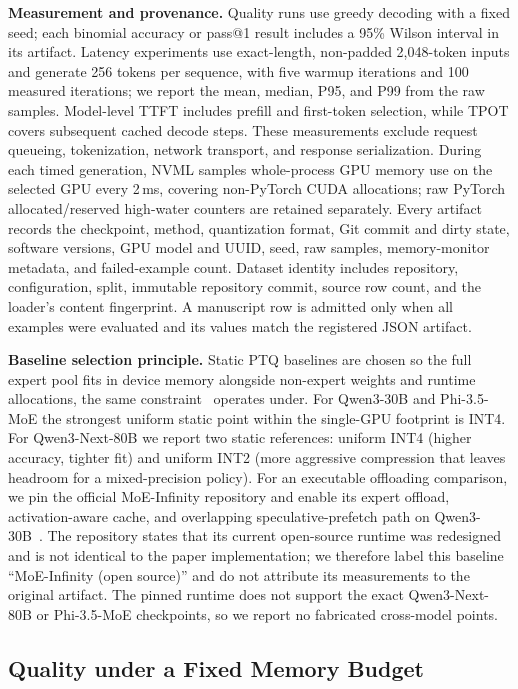 \noindent\textbf{Measurement and provenance.}
Quality runs use greedy decoding with a fixed seed; each binomial accuracy or pass@1 result includes a 95\% Wilson interval in its artifact. Latency experiments use exact-length, non-padded 2,048-token inputs and generate 256 tokens per sequence, with five warmup iterations and 100 measured iterations; we report the mean, median, P95, and P99 from the raw samples. Model-level TTFT includes prefill and first-token selection, while TPOT covers subsequent cached decode steps. These measurements exclude request queueing, tokenization, network transport, and response serialization. During each timed generation, NVML samples whole-process GPU memory use on the selected GPU every 2\,ms, covering non-PyTorch CUDA allocations; raw PyTorch allocated/reserved high-water counters are retained separately. Every artifact records the checkpoint, method, quantization format, Git commit and dirty state, software versions, GPU model and UUID, seed, raw samples, memory-monitor metadata, and failed-example count. Dataset identity includes repository, configuration, split, immutable repository commit, source row count, and the loader's content fingerprint. A manuscript row is admitted only when all examples were evaluated and its values match the registered JSON artifact.

\noindent\textbf{Baseline selection principle.}
Static PTQ baselines are chosen so the full expert pool fits in device memory alongside non-expert weights and runtime allocations, the same constraint \systemname\ operates under. For Qwen3-30B and Phi-3.5-MoE the strongest uniform static point within the single-GPU footprint is INT4. For Qwen3-Next-80B we report two static references: uniform INT4 (higher accuracy, tighter fit) and uniform INT2 (more aggressive compression that leaves headroom for a mixed-precision policy). For an executable offloading comparison, we pin the official MoE-Infinity repository and enable its expert offload, activation-aware cache, and overlapping speculative-prefetch path on Qwen3-30B~\cite{xue2024moe,moeinfinityrepo}. The repository states that its current open-source runtime was redesigned and is not identical to the paper implementation; we therefore label this baseline ``MoE-Infinity (open source)'' and do not attribute its measurements to the original artifact. The pinned runtime does not support the exact Qwen3-Next-80B or Phi-3.5-MoE checkpoints, so we report no fabricated cross-model points.

\subsection{Quality under a Fixed Memory Budget}
\label{sec:eval-quality}

